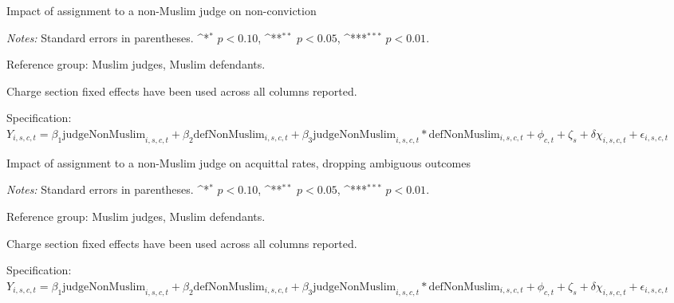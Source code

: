 \documentclass[12pt,english]{article}
\def\sym#1{\ifmmode^{#1}\else\(^{#1}\)\fi}
\begin{document}
\begin{appendices}
\begin{landscape}
\begin{table}
  \begin{center}
     \caption{Impact of assignment to a non-Muslim judge on non-conviction}
      \label{tab:app_random_muslim}
     
    \end{center}
    \begin{minipage}{1.6\textwidth}
        \footnotesize 
        \emph{Notes:} Standard errors in parentheses. \sym{*} \(p<0.10\), \sym{**} \(p<0.05\), \sym{***} \(p<0.01\).  \par 
        Reference group: Muslim judges, Muslim defendants.  \par
        Charge section fixed effects have been used across all columns reported. \par
        Specification: $Y_{i,s,c,t} = \beta_{1} \text{judgeNonMuslim}_{i,s,c,t} + \beta_{2} \text{defNonMuslim}_{i,s,c,t} + \beta_{3} \text{judgeNonMuslim}_{i,s,c,t} * \text{defNonMuslim}_{i,s,c,t} + \phi_{c,t} + \zeta_{s} + \delta \chi_{i,s,c,t} + \epsilon_{i,s,c,t}$  \par
   \end{minipage}
\end{table}


\begin{table}
  \begin{center}
     \caption{Impact of assignment to a non-Muslim judge on acquittal rates,  dropping ambiguous outcomes}
      \label{tab:amb_random_muslim}
     
    \end{center}
    \begin{minipage}{1.6\textwidth}
        \footnotesize 
        \emph{Notes:} Standard errors in parentheses. \sym{*} \(p<0.10\), \sym{**} \(p<0.05\), \sym{***} \(p<0.01\).  \par 
        Reference group: Muslim judges, Muslim defendants.  \par
        Charge section fixed effects have been used across all columns reported. \par
        Specification: $Y_{i,s,c,t} = \beta_{1} \text{judgeNonMuslim}_{i,s,c,t} + \beta_{2} \text{defNonMuslim}_{i,s,c,t} + \beta_{3} \text{judgeNonMuslim}_{i,s,c,t} * \text{defNonMuslim}_{i,s,c,t} + \phi_{c,t} + \zeta_{s} + \delta \chi_{i,s,c,t} + \epsilon_{i,s,c,t}$  \par
   \end{minipage}
\end{table}


\end{landscape}
\end{appendices}
\end{document}
